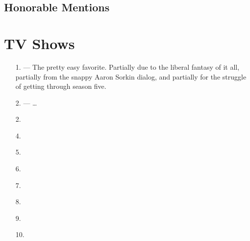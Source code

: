 \documentclass[../butidigress.tex]{subfiles}
\begin{document}
\subsection{Honorable Mentions}

\section{TV Shows}
\begin{itemize}
    \item[1.] \textbf{} --- The pretty easy favorite. Partially due to the liberal fantasy of it all, partially from the snappy Aaron Sorkin dialog, and partially for the struggle of getting through season five.
    \item[2.] \textbf{} --- \ldots
    \item[2.] \textbf{}
    \item[4.] \textbf{}
    \item[5.] \textbf{}
    \item[6.] \textbf{}
    \item[7.] \textbf{}
    \item[8.] \textbf{}
    \item[9.] \textbf{}
    \item[10.] \textbf{}
\end{itemize}
\end{document}
